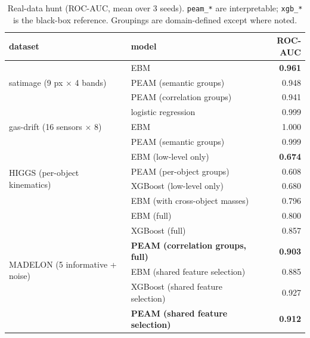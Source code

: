 \documentclass{article}
\begin{document}
\begin{table}[t]
\centering
\caption{Real-data hunt (ROC-AUC, mean over 3 seeds). \texttt{peam\_*} are
interpretable; \texttt{xgb\_*} is the black-box reference. Groupings are
domain-defined except where noted.}
\label{tab:real}
\begin{tabular}{llr}
\toprule
dataset & model & ROC-AUC \\
\midrule
\multirow{3}{*}{satimage (9 px $\times$ 4 bands)}
 & EBM & \textbf{0.961} \\
 & PEAM (semantic groups) & 0.948 \\
 & PEAM (correlation groups) & 0.941 \\
\midrule
\multirow{3}{*}{gas-drift (16 sensors $\times$ 8)}
 & logistic regression & 0.999 \\
 & EBM & 1.000 \\
 & PEAM (semantic groups) & 0.999 \\
\midrule
\multirow{4}{*}{HIGGS (per-object kinematics)}
 & EBM (low-level only) & \textbf{0.674} \\
 & PEAM (per-object groups) & 0.608 \\
 & XGBoost (low-level only) & 0.680 \\
 & EBM (with cross-object masses) & 0.796 \\
\midrule
\multirow{6}{*}{MADELON (5 informative + noise)}
 & EBM (full) & 0.800 \\
 & XGBoost (full) & 0.857 \\
 & \textbf{PEAM (correlation groups, full)} & \textbf{0.903} \\
 & EBM (shared feature selection) & 0.885 \\
 & XGBoost (shared feature selection) & 0.927 \\
 & \textbf{PEAM (shared feature selection)} & \textbf{0.912} \\
\bottomrule
\end{tabular}
\end{table}
\end{document}
